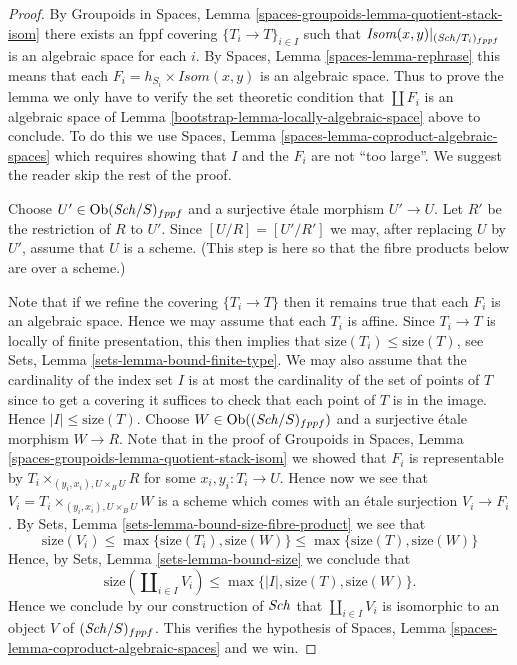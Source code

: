 \begin{proof}

By
Groupoids in Spaces,
Lemma \ref{spaces-groupoids-lemma-quotient-stack-isom}
there exists an fppf covering $\{T_i \to T\}_{i \in I}$
such that $\mathit{Isom}(x, y)|_{(\mathit{Sch}/T_i)_{fppf}}$
is an algebraic space for each $i$. By
Spaces, Lemma \ref{spaces-lemma-rephrase}
this means that each $F_i = h_{S_i} \times \mathit{Isom}(x, y)$
is an algebraic space.
Thus to prove the lemma we only have to verify the set theoretic condition
that $\coprod F_i$ is an algebraic space of
Lemma \ref{bootstrap-lemma-locally-algebraic-space}
above to conclude. To do this we use
Spaces, Lemma \ref{spaces-lemma-coproduct-algebraic-spaces}
which requires showing that $I$ and the $F_i$ are not ``too large''.
We suggest the reader skip the rest of the proof.

\medskip\noindent
Choose $U' \in \operatorname{Ob}(\mathit{Sch}/S)_{fppf}$ and a surjective
\'etale morphism $U' \to U$. Let $R'$ be the restriction of $R$ to $U'$.
Since $[U/R] = [U'/R']$ we may, after replacing $U$ by $U'$,
assume that $U$ is a scheme. (This step is here so that the
fibre products below are over a scheme.)

\medskip\noindent
Note that if we refine the covering $\{T_i \to T\}$ then it remains
true that each $F_i$ is an algebraic space.
Hence we may assume that each $T_i$ is affine. Since
$T_i \to T$ is locally of finite presentation, this then implies that
$\text{size}(T_i) \leq \text{size}(T)$, see
Sets, Lemma \ref{sets-lemma-bound-finite-type}.
We may also assume that the cardinality of the index set $I$ is at most the
cardinality of the set of points of $T$ since to get a
covering it suffices to check that each point of $T$ is in the image.
Hence $|I| \leq \text{size}(T)$.
Choose $W \in \operatorname{Ob}((\mathit{Sch}/S)_{fppf})$
and a surjective \'etale morphism $W \to R$. Note that in the proof of
Groupoids in Spaces,
Lemma \ref{spaces-groupoids-lemma-quotient-stack-isom}
we showed that $F_i$ is representable by
$T_i \times_{(y_i, x_i), U \times_B U} R$ for some
$x_i, y_i : T_i \to U$. Hence now we see that
$V_i = T_i \times_{(y_i, x_i), U \times_B U} W$ is a
scheme which comes with an \'etale surjection $V_i \to F_i$.
By
Sets, Lemma \ref{sets-lemma-bound-size-fibre-product}
we see that
$$
\text{size}(V_i) \leq \max\{\text{size}(T_i), \text{size}(W)\}
\leq \max\{\text{size}(T), \text{size}(W)\}
$$
Hence, by
Sets, Lemma \ref{sets-lemma-bound-size}
we conclude that
$$
\text{size}(\coprod\nolimits_{i \in I} V_i)
\leq \max\{|I|, \text{size}(T), \text{size}(W)\}.
$$
Hence we conclude by our construction of $\mathit{Sch}$
that $\coprod_{i \in I} V_i$ is isomorphic to an object
$V$ of $(\mathit{Sch}/S)_{fppf}$. This verifies the
hypothesis of
Spaces, Lemma \ref{spaces-lemma-coproduct-algebraic-spaces}
and we win.
\end{proof}

